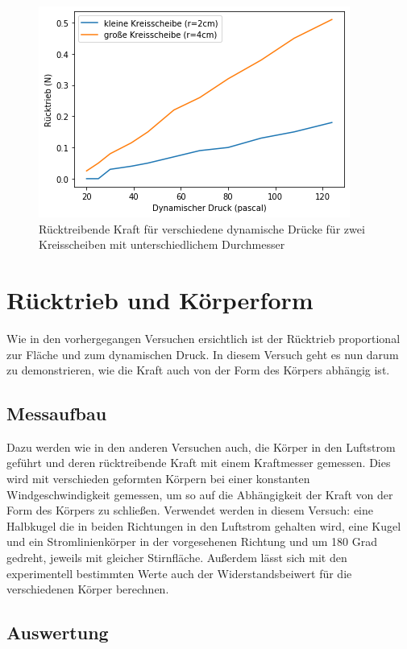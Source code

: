 \begin{figure}[h]
    \centering
    \includegraphics[scale= 0.8]{Aeromechanik/Protokoll/fig/Aeromechanik Versuch 2.22.png}
    \caption{Rücktreibende Kraft für verschiedene dynamische Drücke für zwei Kreisscheiben mit unterschiedlichem Durchmesser}
    \label{fig:Aeromechanik Versuch 2.22}
\end{figure}

\section{Rücktrieb und Körperform}

Wie in den vorhergegangen Versuchen ersichtlich ist der Rücktrieb proportional zur Fläche und zum dynamischen Druck. In diesem Versuch geht es nun darum zu demonstrieren, wie die Kraft auch von der Form des Körpers abhängig ist. 

\subsection{Messaufbau}

Dazu werden wie in den anderen Versuchen auch, die Körper in den Luftstrom geführt und deren rücktreibende Kraft mit einem Kraftmesser gemessen. Dies wird mit verschieden geformten Körpern bei einer konstanten Windgeschwindigkeit gemessen, um so auf die Abhängigkeit der Kraft von der Form des Körpers zu schließen. Verwendet werden in diesem Versuch: eine Halbkugel die in beiden Richtungen in den Luftstrom gehalten wird, eine Kugel und ein Stromlinienkörper in der vorgesehenen Richtung und um 180 Grad gedreht, jeweils mit gleicher Stirnfläche. Außerdem lässt sich mit den experimentell bestimmten Werte auch der Widerstandsbeiwert für die verschiedenen Körper berechnen.

\subsection{Auswertung}


